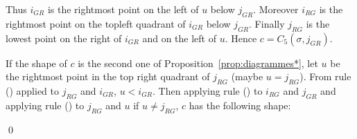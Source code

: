 \documentclass[11pt]{article}
\newenvironment{pf}{{\em \noindent Proof:}}{ \hfill \qed\smallskip}
\newcommand{\rmnum}[1]{\romannumeral #1}
\newcommand{\Vpoint}[2]{\draw (#1,#2) [darkgreen,fill=darkgreen] circle (3pt);}
\newcommand{\Hpoint}[2]{\draw (#1,#2) [darkred,fill=darkred] circle (3pt);}
\newcommand{\zoneRG}[3]{
\draw [very thick,H,Hpoint] (#1,#2) -- +(-#3,0);
\draw [very thick,V,Vpoint] (#1,#2) -- +(0,#3);
\draw [Hfill] (#1,#2) -- +(-#3,#3) -- +(-#3,0);
\draw [Vfill] (#1,#2) -- +(-#3,#3) -- + (0,#3);
}
\newcommand{\zoneGR}[3]{
\draw [very thick,H,Hpoint] (#1,#2) -- +(-#3,0);
\draw [very thick,V,Vpoint] (#1,#2) -- +(0,#3);
\draw [Vfill] (#1,#2) -- +(-#3,#3) -- +(-#3,0);
\draw [Hfill] (#1,#2) -- +(-#3,#3) -- + (0,#3);
}
\begin{document}
\begin{pf}
\begin{minipage}{.2\textwidth}
\end{minipage}
\begin{minipage}{.75\textwidth}
Thus $i_{GR}$ is the rightmost point on the left of $u$ below $j_{GR}$. 
Moreover $i_{RG}$ is the rightmost point on the topleft quadrant of $i_{GR}$ below $j_{GR}$.
Finally $j_{RG}$ is the lowest point on the right of $i_{GR}$ and on the left of $u$.
Hence $c = C_5(\sigma, j_{GR})$.
\end{minipage}

If the shape of $c$ is the second one of Proposition~\ref{prop:diagrammes*}, 
let $u$ be the rightmost point in the top right quadrant of $j_{RG}$ (maybe $u = j_{RG}$).
From rule (\rmnum{8}) applied to $j_{RG}$ and $i_{GR}$, $u < i_{GR}$.
Then applying rule (\rmnum{2}) to $i_{RG}$ and $j_{GR}$ 
and applying rule (\rmnum{1}) to $j_{RG}$ and $u$ if $u \neq j_{RG}$, $c$ has the following shape:


\end{pf}
\end{document}
